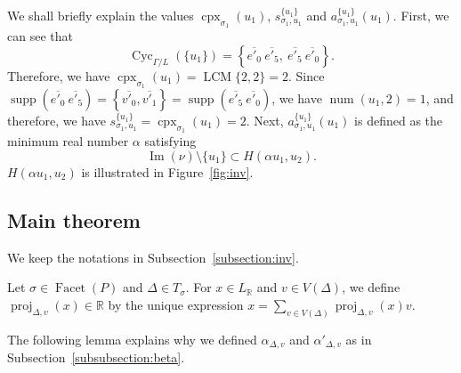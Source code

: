 \documentclass[11pt]{article}
\theoremstyle{definition}
\numberwithin{equation}{section}
\begin{document}
\begin{ex}
We shall briefly explain the values 
$\operatorname{cpx}_{\sigma _1}(u_1)$, 
$s_{\sigma _1, u_1}^{\{ u_1 \}}$ and $a_{\sigma _1, u_1}^{\{ u_1 \}} (u_1)$. 
First, we can see that 
\[
\operatorname{Cyc}_{\Gamma /L}(\{ u_1 \})
= \left \{ \overline{e'_0}\ \overline{e'_5}, \ \overline{e'_5}\ \overline{e'_0} \right \}. 
\]
Therefore, we have $\operatorname{cpx}_{\sigma _1}(u_1) = \operatorname{LCM}\{ 2,2 \} = 2$. 
Since $\operatorname{supp}\left( \overline{e'_0}\ \overline{e'_5} \right) = 
\left \{ \overline{v'_0}, \overline{v'_1} \right \} =
\operatorname{supp}\left( \overline{e'_5}\ \overline{e'_0} \right)$, 
we have $\operatorname{num}(u_1, 2) = 1$, and therefore, 
we have $s_{\sigma _1, u_1}^{\{ u_1 \}} = \operatorname{cpx}_{\sigma _1}(u_1)  = 2$. 
Next, $a_{\sigma _1, u_1}^{\{ u_1 \}} (u_1)$ is defined as the minimum real number $\alpha$ satisfying
\[
\operatorname{Im}(\nu) \setminus \{ u_1 \} \subset H(\alpha u_1, u_2). 
\]
$H \left( \alpha u_1, u_2 \right)$ is illustrated in Figure~\ref{fig:inv}. 
\end{ex}


\subsection{Main theorem}\label{subsection:main}
We keep the notations in Subsection~\ref{subsection:inv}. 

\begin{defn}
Let $\sigma \in \operatorname{Facet}(P)$ and $\Delta \in T_{\sigma}$. 
For $x \in L_{\mathbb{R}}$ and $v \in V(\Delta)$, we define $\operatorname{proj}_{\Delta, v}(x) \in \mathbb{R}$ by the unique expression
$x = \sum _{v \in V(\Delta)} \operatorname{proj}_{\Delta, v}(x) v$. 
\end{defn}

The following lemma explains why we defined $\alpha _{\Delta, v}$ and $\alpha' _{\Delta, v}$ as in Subsection~\ref{subsubsection:beta}. 
\end{document}
